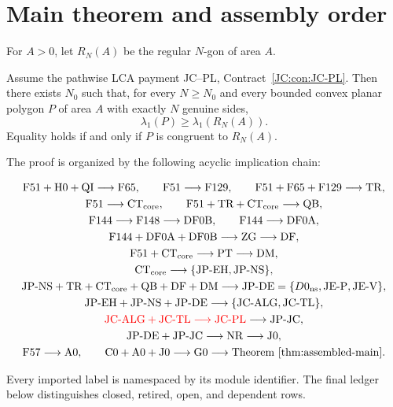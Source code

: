 \documentclass[11pt]{amsart}
\begin{document}
\section{Main theorem and assembly order}
\label{sec:assembled-main}

For $A>0$, let $R_N(A)$ be the regular $N$-gon of area $A$.

\begin{theorem}
\label{thm:assembled-main}
Assume the pathwise LCA payment JC--PL,
Contract~\ref{JC:con:JC-PL}.  Then there exists $N_0$ such that, for every
$N\ge N_0$ and every bounded convex planar polygon $P$ of area $A$ with
exactly $N$ genuine sides,
\[
 \lambda_1(P)\ge \lambda_1(R_N(A)).
\]
Equality holds if and only if $P$ is congruent to $R_N(A)$.
\end{theorem}

The proof is organized by the following acyclic implication chain:
\begin{scriptsize}
\[
\begin{gathered}
 \mathrm{F51+H0+QI}\longrightarrow\mathrm{F65},\qquad
 \mathrm{F51}\longrightarrow\mathrm{F129},\qquad
 \mathrm{F51+F65+F129}\longrightarrow\mathrm{TR},\\
 \mathrm{F51}\longrightarrow\mathrm{CT_{core}},\qquad
 \mathrm{F51+TR+CT_{core}}\longrightarrow\mathrm{QB},\\
 \mathrm{F144}\longrightarrow\mathrm{F148}\longrightarrow\mathrm{DF0B},
 \qquad \mathrm{F144}\longrightarrow\mathrm{DF0A},\\
 \mathrm{F144+DF0A+DF0B}\longrightarrow\mathrm{ZG}
 \longrightarrow\mathrm{DF},\\
 \mathrm{F51+CT_{core}}\longrightarrow\mathrm{PT}
 \longrightarrow\mathrm{DM},\\
 \mathrm{CT_{core}}\longrightarrow
 \{\mathrm{JP\text{-}EH},\mathrm{JP\text{-}NS}\},\\
 \mathrm{JP\text{-}NS+TR+CT_{core}+QB+DF+DM}
 \longrightarrow\mathrm{JP\text{-}DE}
 =\{D0_{\rm ns},\mathrm{JE\text{-}P},\mathrm{JE\text{-}V}\},\\
 \mathrm{JP\text{-}EH+JP\text{-}NS+JP\text{-}DE}
 \longrightarrow\{\mathrm{JC\text{-}ALG},\mathrm{JC\text{-}TL}\},\\
 \textcolor{red}{\mathrm{JC\text{-}ALG+JC\text{-}TL}
 \longrightarrow\mathrm{JC\text{-}PL}}
 \longrightarrow\mathrm{JP\text{-}JC},\\
 \mathrm{JP\text{-}DE+JP\text{-}JC}\longrightarrow\mathrm{NR}
 \longrightarrow\mathrm{J0},\\
 \mathrm{F57}\longrightarrow\mathrm{A0},\qquad
 \mathrm{C0+A0+J0}\longrightarrow\mathrm{G0}
 \longrightarrow\text{Theorem~\ref{thm:assembled-main}}.
\end{gathered}
\]
\end{scriptsize}
Every imported label is namespaced by its module identifier.  The final
ledger below distinguishes closed, retired, open, and dependent rows.
\end{document}
